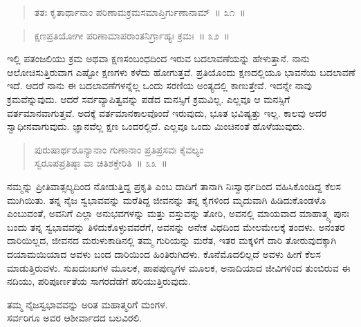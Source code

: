 \begin{verse}
ತತಃ ಕೃತಾರ್ಥಾನಾಂ ಪರಿಣಾಮಕ್ರಮಸಮಾಪ್ತಿರ್ಗುಣಾನಾಮ್​~॥ ೩೧~॥
\end{verse}

\vspace{-0.3cm}


\begin{verse}
ಕ್ಷಣಪ್ರತಿಯೋಗೀ ಪರಿಣಾಮಾಪರಾಂತನಿರ್ಗ್ರಾಹ್ಯಃ ಕ್ರಮಃ~॥ ೩೨~॥
\end{verse}

\vspace{-0.3cm}


ಇಲ್ಲಿ ಪತಂಜಲಿಯು ಕ್ರಮ ಅಥವಾ ಕ್ಷಣಸಂಬಂಧದಿಂದ ಇರುವ ಬದಲಾವಣೆಯನ್ನು ಹೇಳುತ್ತಾನೆ. ನಾನು ಆಲೋಚಿಸುತ್ತಿರುವಾಗ ಎಷ್ಟೋ ಕ್ಷಣಗಳು ಕಳೆದು ಹೋಗುತ್ತವೆ. ಪ್ರತಿಯೊಂದು ಕ್ಷಣದಲ್ಲಿಯೂ ಭಾವನೆಯ ಬದಲಾವಣೆ ಇದೆ. ಆದರೆ ನಾನು ಈ ಬದಲಾವಣೆಗಳನ್ನೆಲ್ಲ ಒಂದು ಸರಣಿಯ ಅಂತ್ಯದಲ್ಲಿ ಕಾಣುತ್ತೇವೆ. ಇದನ್ನೇ ನಾವು ಕ್ರಮವೆನ್ನುವುದು. ಆದರೆ ಸರ್ವವ್ಯಾಪಿತ್ವವನ್ನು ಪಡೆದ ಮನಸ್ಸಿಗೆ ಕ್ರಮವಿಲ್ಲ. ಎಲ್ಲವೂ ಆ ಮನಸ್ಸಿಗೆ ವರ್ತಮಾನವಾಗುತ್ತವೆ. ಅದಕ್ಕೆ ವರ್ತಮಾನಕಾಲವೊಂದೆ ಇರುವುದು, ಭೂತ ಭವಿಷ್ಯತ್ತು ಇಲ್ಲ. ಕಾಲವು ಅದರ ಸ್ವಾಧೀನವಾಗುವುದು. ಜ್ಞಾನವೆಲ್ಲ ಕ್ಷಣ ಒಂದರಲ್ಲಿದೆ. ಎಲ್ಲವೂ ಒಂದು ಮಿಂಚಿನಂತೆ ಹೊಳೆಯುವುದು.

\begin{verse}
ಪುರುಷಾರ್ಥಶೂನ್ಯಾನಾಂ ಗುಣಾನಾಂ ಪ್ರತಿಪ್ರಸವಃ ಕೈವಲ್ಯಂ \\ಸ್ವರೂಪಪ್ರತಿಷ್ಠಾ ವಾ ಚಿತಿಶಕ್ತೇರಿತಿ~\hfill{॥ ೩೩~॥}
\end{verse}

\vspace{-0.3cm}


\eject

ನಮ್ಮನ್ನು ಪ್ರೀತಿವಾತ್ಸಲ್ಯದಿಂದ ನೋಡುತ್ತಿದ್ದ ಪ್ರಕೃತಿ ಎಂಬ ದಾದಿಗೆ ತಾನಾಗಿ ನಿಃಸ್ವಾರ್ಥದಿಂದ ವಹಿಸಿಕೊಂಡಿದ್ದ ಕೆಲಸ ಮುಗಿಯಿತು. ತನ್ನ ನೈಜ ಸ್ವಭಾವವನ್ನು ಮರೆತಿದ್ದ ಜೀವನನ್ನು ತನ್ನ ಕೈಗಳಿಂದ ಮೃದುವಾಗಿ ಹಿಡಿದುಕೊಂಡಳೊ ಎಂಬುವಂತೆ, ಅವನಿಗೆ ಎಲ್ಲಾ ಅನುಭವಗಳನ್ನು ಮತ್ತು ವಸ್ತುವನ್ನು ತೋರಿ, ಅವನಲ್ಲಿ ಮಾಯವಾದ ಮಾಹಾತ್ಮ್ಯ ಪುನಃ ಬಂದು ತನ್ನ ಸ್ವಭಾವವನ್ನು ತಿಳಿದುಕೊಳ್ಳುವವರೆಗೆ, ಅವನನ್ನು ಅನೇಕ ವಿಧದಿಂದ ಮೇಲಮೇಲಕ್ಕೆ ತಂದಳು. ಅನಂತರ ದಾರಿಯಿಲ್ಲದ, ಜೀವನದ ಮರುಳುಕಾಡಿನಲ್ಲಿ ತಮ್ಮ ಗುರಿಯನ್ನು ಮರೆತ, ಇತರ ಮಕ್ಕಳಿಗೆ ದಾರಿ ತೋರುವುದಕ್ಕಾಗಿ ದಯಾಮಯಿಯಾದ ಅವಳು ಬಂದ ದಾರಿಯಿಂದ ಹಿಂತಿರುಗಿದಳು. ಕೊನೆಮೊದಲಿಲ್ಲದೆ ಅವಳು ಹೀಗೆ ಕೆಲಸ ಮಾಡುತ್ತಿರುವಳು. ಸುಖದುಃಖಗಳ ಮೂಲಕ, ಪಾಪಪುಣ್ಯಗಳ ಮೂಲಕ, ಅನಾದಿಯಾದ ಜೀವಿಗಳಿಂದ ತುಂಬಿರುವ ಈ ನದಿಯು, ಪರಿಪೂರ್ಣತೆಯ ಸಾಗರದೆಡೆಗೆ ಹರಿಯುತ್ತಿರುವುದು.

\begin{center}
ತಮ್ಮ ನೈಜಸ್ವಭಾವವನ್ನು ಅರಿತ ಮಹಾತ್ಮರಿಗೆ ಮಂಗಳ. \\ ಸರ್ವರಿಗೂ ಅವರ ಆಶೀರ್ವಾದದ ಬಲವಿರಲಿ. 
\end{center}

